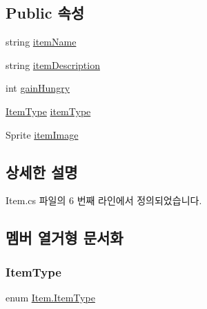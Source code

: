 \subsection*{Public 속성}
\begin{DoxyCompactItemize}
\item 
string \mbox{\hyperlink{class_item_a8c54f77a262b1ffd78c1cd8cbed86ae0}{item\+Name}}
\item 
string \mbox{\hyperlink{class_item_a1e47deb8739893cbfa26460cf4be4f00}{item\+Description}}
\item 
int \mbox{\hyperlink{class_item_abc2de92b7661dbc05ff5b7d445cae487}{gain\+Hungry}}
\item 
\mbox{\hyperlink{class_item_ab5eeb575e9d66ebcfef9b58b667fad05}{Item\+Type}} \mbox{\hyperlink{class_item_adbecc774c576b08f57f32655acf7363d}{item\+Type}}
\item 
Sprite \mbox{\hyperlink{class_item_aa189431b0e859890a3b9118da64cc484}{item\+Image}}
\end{DoxyCompactItemize}


\subsection{상세한 설명}


Item.\+cs 파일의 6 번째 라인에서 정의되었습니다.



\subsection{멤버 열거형 문서화}
\mbox{\label{class_item_ab5eeb575e9d66ebcfef9b58b667fad05}} 
\subsubsection{\texorpdfstring{ItemType}{ItemType}}
{\footnotesize\ttfamily enum \mbox{\hyperlink{class_item_ab5eeb575e9d66ebcfef9b58b667fad05}{Item.\+Item\+Type}}\hspace{0.3cm}{\ttfamily [strong]}}

